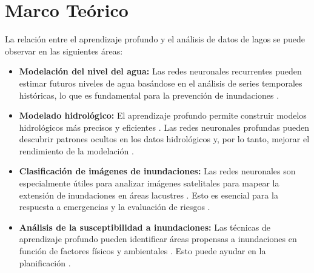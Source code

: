 \documentclass[12pt]{article}
\begin{document}
\section{Marco Te\'orico}
La relación entre el aprendizaje profundo y el análisis de datos de lagos se puede observar en las siguientes áreas:
\begin{itemize}[label=\textbullet]
    \item \textbf{Modelación del nivel del agua:} Las redes neuronales recurrentes pueden estimar futuros niveles de agua basándose en el análisis de series temporales históricas, lo que es fundamental para la prevención de inundaciones \cite{ayus2023}.
    \item \textbf{Modelado hidrológico:} El aprendizaje profundo permite construir modelos hidrológicos más precisos y eficientes \cite{bentivoglio2022}. Las redes neuronales profundas pueden descubrir patrones ocultos en los datos hidrológicos y, por lo tanto, mejorar el rendimiento de la modelación \cite{bentivoglio2022}.
    \item \textbf{Clasificación de imágenes de inundaciones:} Las redes neuronales son especialmente útiles para analizar imágenes satelitales para mapear la extensión de inundaciones en áreas lacustres \cite{bentivoglio2022}. Esto es esencial para la respuesta a emergencias y la evaluación de riesgos \cite{bentivoglio2022}.
    \item \textbf{Análisis de la susceptibilidad a inundaciones:} Las técnicas de aprendizaje profundo pueden identificar áreas propensas a inundaciones en función de factores físicos y ambientales \cite{bentivoglio2022}. Esto puede ayudar en la planificación \cite{bentivoglio2022}.
\end{itemize}


\printbibliography
\end{document}
